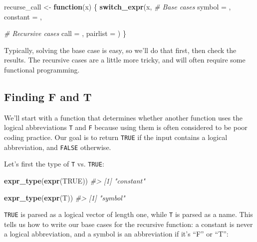 \documentclass[]{book}
\newenvironment{Shaded}{\begin{snugshade}}{\end{snugshade}}
\newcommand{\CommentTok}[1]{\textcolor[rgb]{0.37,0.37,0.37}{\textit{#1}}}
\newcommand{\ControlFlowTok}[1]{\textcolor[rgb]{0.27,0.27,0.27}{\textbf{#1}}}
\newcommand{\DataTypeTok}[1]{\textcolor[rgb]{0.27,0.27,0.27}{#1}}
\newcommand{\KeywordTok}[1]{\textcolor[rgb]{0.27,0.27,0.27}{\textbf{#1}}}
\newcommand{\NormalTok}[1]{#1}
\newcommand{\OtherTok}[1]{\textcolor[rgb]{0.37,0.37,0.37}{#1}}
\newcommand{\StringTok}[1]{\textcolor[rgb]{0.5,0.5,0.5}{#1}}
\begin{document}
\begin{Shaded}
\begin{Highlighting}[]
\NormalTok{recurse_call <-}\StringTok{ }\ControlFlowTok{function}\NormalTok{(x) \{}
  \KeywordTok{switch_expr}\NormalTok{(x,}
    \CommentTok{# Base cases}
    \DataTypeTok{symbol =}\NormalTok{ ,}
    \DataTypeTok{constant =}\NormalTok{ ,}

    \CommentTok{# Recursive cases}
    \DataTypeTok{call =}\NormalTok{ ,}
    \DataTypeTok{pairlist =}
\NormalTok{  )}
\NormalTok{\}}
\end{Highlighting}
\end{Shaded}

Typically, solving the base case is easy, so we'll do that first, then check the results. The recursive cases are a little more tricky, and will often require some functional programming.

\hypertarget{finding-f-and-t}{%
\subsection{Finding F and T}\label{finding-f-and-t}}

We'll start with a function that determines whether another function uses the logical abbreviations \texttt{T} and \texttt{F} because using them is often considered to be poor coding practice. Our goal is to return \texttt{TRUE} if the input contains a logical abbreviation, and \texttt{FALSE} otherwise.

Let's first the type of \texttt{T} vs. \texttt{TRUE}:

\begin{Shaded}
\begin{Highlighting}[]
\KeywordTok{expr_type}\NormalTok{(}\KeywordTok{expr}\NormalTok{(}\OtherTok{TRUE}\NormalTok{))}
\CommentTok{#> [1] "constant"}

\KeywordTok{expr_type}\NormalTok{(}\KeywordTok{expr}\NormalTok{(T))}
\CommentTok{#> [1] "symbol"}
\end{Highlighting}
\end{Shaded}

\texttt{TRUE} is parsed as a logical vector of length one, while \texttt{T} is parsed as a name. This tells us how to write our base cases for the recursive function: a constant is never a logical abbreviation, and a symbol is an abbreviation if it's ``F'' or ``T'':
\end{document}
